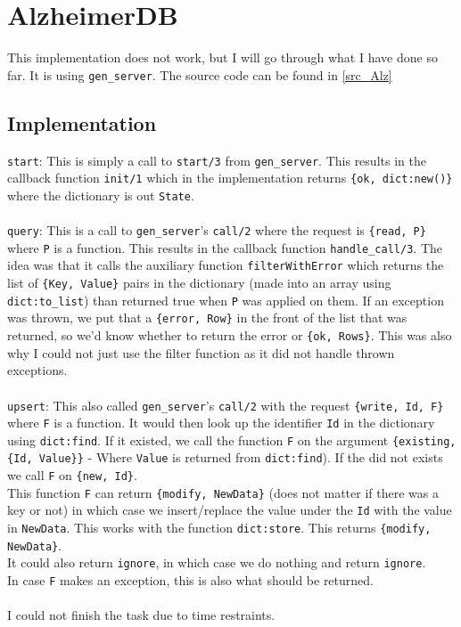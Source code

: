 \documentclass[a4paper]{article}
\begin{document}
\section{AlzheimerDB}
This implementation does not work, but I will go through what I have done so far. It is using \texttt{gen\_server}. The source code can be found in \ref{src_Alz}

\subsection{Implementation}
\texttt{start}:
This is simply a call to \texttt{start/3} from \texttt{gen\_server}. This results in the callback function \texttt{init/1} which in the implementation returns \texttt{\{ok, dict:new()\}} where the dictionary is out \texttt{State}. \\
\\
\texttt{query}:
This is a call to \texttt{gen\_server}'s \texttt{call/2} where the request is \texttt{\{read, P\}} where \texttt{P} is a function. This results in the callback function \texttt{handle\_call/3}. The idea was that it calls the auxiliary function \texttt{filterWithError} which returns the list of \texttt{\{Key, Value\}} pairs in the dictionary (made into an array using \texttt{dict:to\_list}) than returned true when \texttt{P} was applied on them. If an exception was thrown, we put that a \texttt{\{error, Row\}} in the front of the list that was returned, so we'd know whether to return the error or \texttt{\{ok, Rows\}}. This was also why I could not just use the filter function as it did not handle thrown exceptions. \\
\\
\texttt{upsert}:
This also called \texttt{gen\_server}'s \texttt{call/2} with the request \texttt{\{write, Id, F\}} where \texttt{F} is a function. It would then look up the identifier \texttt{Id} in the dictionary using \texttt{dict:find}. If it existed, we call the function \texttt{F} on the argument \texttt{\{existing, \{Id, Value\}\}}  - Where \texttt{Value} is returned from \texttt{dict:find}). If the did not exists we call \texttt{F} on \texttt{\{new, Id\}}. \\
This function \texttt{F} can return \texttt{\{modify, NewData\}} (does not matter if there was a key or not) in which case we insert/replace the value under the \texttt{Id} with the value in \texttt{NewData}. This works with the function \texttt{dict:store}. This returns \texttt{\{modify, NewData\}}. \\
It could also return \texttt{ignore}, in which case we do nothing and return \texttt{ignore}. \\
In case \texttt{F} makes an exception, this is also what should be returned.\\
\\
I could not finish the task due to time restraints.
\end{document}
